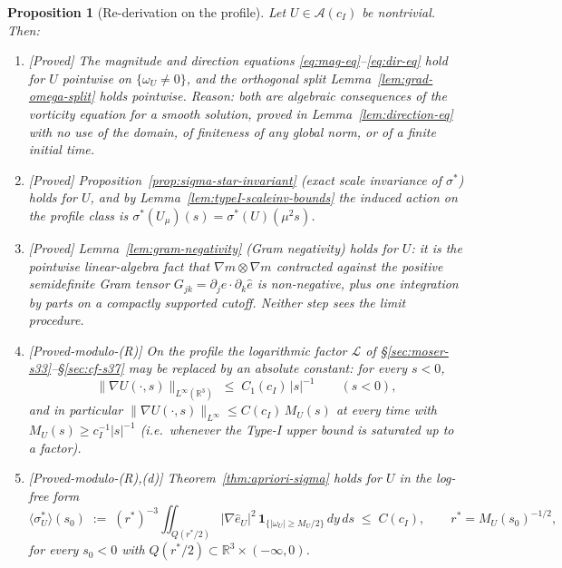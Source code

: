 \documentclass[11pt]{article}
\newtheorem{proposition}[theorem]{Proposition}
\theoremstyle{definition}
\theoremstyle{remark}
\newcommand{\R}{\mathbb{R}}
\begin{document}
\begin{proposition}[Re-derivation on the profile]\label{prop:transfer-audit}
  Let $U\in\mathcal{A}(c_I)$ be nontrivial. Then:
  \begin{enumerate}[label=(\alph*)]
  \item \emph{[Proved]} The magnitude and direction
    equations \eqref{eq:mag-eq}--\eqref{eq:dir-eq} hold for $U$ pointwise on
    $\{\omega_U\neq0\}$, and the orthogonal split
    Lemma~\ref{lem:grad-omega-split} holds pointwise. Reason: both are
    algebraic consequences of the vorticity equation for a smooth solution,
    proved in Lemma~\ref{lem:direction-eq} with no use of the domain,
    of finiteness of any global norm, or of a finite initial time.
  \item \emph{[Proved]} Proposition~\ref{prop:sigma-star-invariant} (exact
    scale invariance of $\sigma^*$) holds for $U$, and by
    Lemma~\ref{lem:typeI-scaleinv-bounds} the induced action on the profile
    class is $\sigma^*(U_\mu)(s)=\sigma^*(U)(\mu^2 s)$.
  \item \emph{[Proved]} Lemma~\ref{lem:gram-negativity} (Gram negativity)
    holds for $U$: it is the pointwise linear-algebra fact that
    $\nabla m\otimes\nabla m$ contracted against the positive semidefinite
    Gram tensor $G_{jk}=\partial_j\hat e\cdot\partial_k\hat e$ is
    non-negative, plus one integration by parts on a compactly supported
    cutoff. Neither step sees the limit procedure.
  \item \emph{[Proved-modulo-(R)]} On the profile the logarithmic factor
    $\mathcal{L}$ of \S\ref{sec:moser-s33}--\S\ref{sec:cf-s37} may be
    replaced by an absolute constant: for every $s<0$,
    \[
      \bigl\|\nabla U(\cdot,s)\bigr\|_{L^\infty(\R^3)}
      \;\leq\; C_1(c_I)\,|s|^{-1}
      \qquad (s<0),
    \]
    and in particular $\|\nabla U(\cdot,s)\|_{L^\infty}\leq C(c_I)\,M_U(s)$
    at every time with $M_U(s)\geq c_I^{-1}|s|^{-1}$ (i.e.\ whenever the
    Type-I upper bound is saturated up to a factor).
  \item \emph{[Proved-modulo-(R),(d)]} Theorem~\ref{thm:apriori-sigma} holds
    for $U$ in the log-free form
    \begin{equation}\label{eq:profile-apriori}
      \langle\sigma^*_U\rangle(s_0)
      \;:=\;(r^*)^{-3}\iint_{Q(r^*/2)}|\nabla\hat e_U|^2\,
        \mathbf{1}_{\{|\omega_U|\geq M_U/2\}}\,dy\,ds
      \;\leq\; C(c_I),
      \qquad r^* = M_U(s_0)^{-1/2},
    \end{equation}
    for every $s_0<0$ with $Q(r^*/2)\subset\R^3\times(-\infty,0)$.
  \end{enumerate}
\end{proposition}
\end{document}
